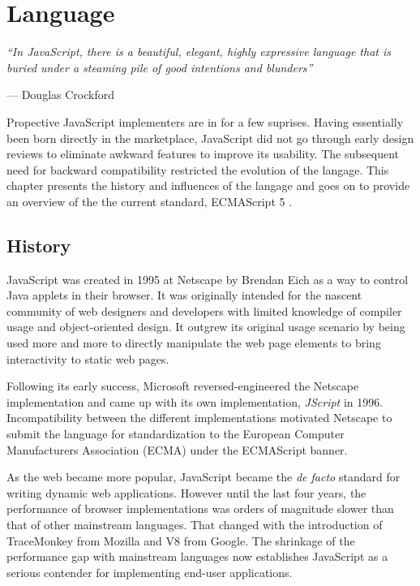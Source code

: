 \chapter{Language}

\emph{``In JavaScript, there is a beautiful, elegant, highly expressive language that is buried under a steaming pile of good intentions and blunders''}

\hfill --- Douglas Crockford \cite{Crockford:2008}

Propective JavaScript implementers are in for a few suprises. Having essentially been born directly in the marketplace, JavaScript did not go through early design reviews to eliminate awkward features to improve its usability.  The subsequent need for backward compatibility restricted the evolution of the langage. This chapter presents the history and influences of the langage and goes on to provide an overview of the the current standard, ECMAScript 5 \cite{ECMA:2009}. 

\section{History}

JavaScript was created in 1995 at Netscape by Brendan Eich as a way to control Java applets in their browser. It was originally intended for the nascent community of web designers and developers with limited knowledge of compiler usage and object-oriented design. It outgrew its original usage scenario by being used more and more to directly manipulate the web page elements to bring interactivity to static web pages.

Following its early success, Microsoft reversed-engineered the Netscape implementation and came up with its own implementation, \textit{JScript} in 1996. Incompatibility between the different implementations motivated Netscape to submit the language for standardization to the European Computer Manufacturers Association (ECMA) under the ECMAScript banner.~\cite{Champeon:2001}

As the web became more popular, JavaScript became the \textit{de facto} standard for writing dynamic web applications. However until the last four years, the performance of browser implementations was orders of magnitude slower than that of other mainstream languages. That changed with the introduction of TraceMonkey from Mozilla and V8 from Google. The shrinkage of the performance gap with mainstream languages now establishes JavaScript as a serious contender for implementing end-user applications.

